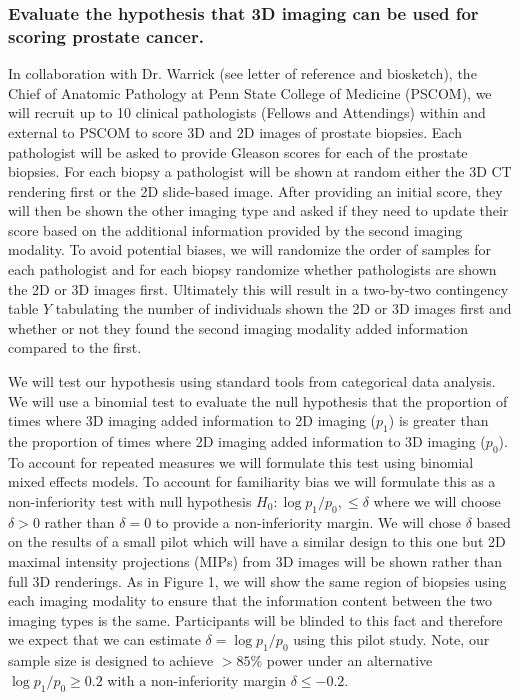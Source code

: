 \documentclass{NIHGrant}
\theoremstyle{theorem}
\begin{document}
\subsubsection*{Evaluate the hypothesis that 3D imaging can be used for scoring prostate cancer.}
In collaboration with Dr. Warrick (see letter of reference and biosketch), the Chief of Anatomic Pathology at Penn State College of Medicine (PSCOM), we will recruit up to 10 clinical pathologists (Fellows and Attendings) within and external to PSCOM to score 3D and 2D images of prostate biopsies. Each pathologist will be asked to provide Gleason scores for each of the prostate biopsies. For each biopsy a pathologist will be shown at random either the 3D CT rendering first or the 2D slide-based image. After providing an initial score, they will then be shown the other imaging type and asked if they need to update their score based on the additional information provided by the second imaging modality. To avoid potential biases, we will randomize the order of samples for each pathologist and for each biopsy randomize whether pathologists are shown the 2D or 3D images first. Ultimately this will result in a two-by-two contingency table \(Y\) tabulating the number of individuals shown the 2D or 3D images first and whether or not they found the second imaging modality added information compared to the first.

We will test our hypothesis using standard tools from categorical data analysis. We will use a binomial test to evaluate the null hypothesis that the proportion of times where 3D imaging added information to 2D imaging (\(p_{1}\)) is greater than the proportion of times where 2D imaging added information to 3D imaging (\(p_{0}\)). To account for repeated measures we will formulate this test using binomial mixed effects models. To account for familiarity bias we will formulate this as a non-inferiority test with null hypothesis \(H_{0}:\log p_{1}/p_{0},\leq \delta\) where we will choose  \(\delta>0\) rather than \(\delta=0\) to provide a non-inferiority margin. We will chose \(\delta\) based on the results of a small pilot which will have a similar design to this one but 2D maximal intensity projections (MIPs) from 3D images will be shown rather than full 3D renderings. As in Figure 1, we will show the same region of biopsies using each imaging modality to ensure that the information content between the two imaging types is the same. Participants will be blinded to this fact and therefore we expect that we can estimate \(\delta=\log p_{1}/p_{0}\) using this pilot study. Note, our sample size is designed to achieve \(>85\%\) power under an alternative \(\log p_{1}/p_{0}\geq 0.2\) with a non-inferiority margin \(\delta\leq-0.2\).
\end{document}
